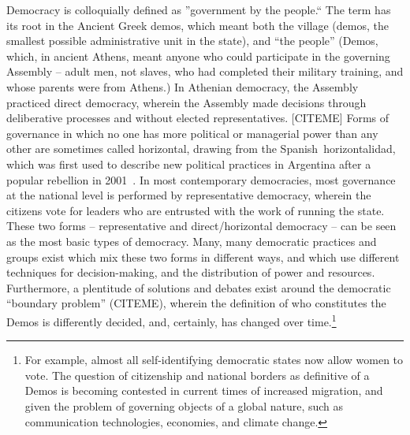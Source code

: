 Democracy is colloquially defined as ''government by the people.`` The term has
its root in the Ancient Greek demos, which meant both the village (demos, the
smallest possible administrative unit in the state), and ``the people'' (Demos,
which, in ancient Athens, meant anyone who could participate in the governing
Assembly -- adult men, not slaves, who had completed their military training,
and whose parents were from Athens.) In Athenian democracy, the Assembly
practiced direct democracy, wherein the Assembly made decisions through
deliberative processes and without elected representatives. [CITEME] Forms of
governance in which no one has more political or managerial power than any other
are sometimes called horizontal, drawing from the Spanish horizontalidad, which
was first used to describe new political practices in Argentina after a popular
rebellion in 2001~\cite{sitrin2012everyday}. In most contemporary democracies,
most governance at the national level is performed by representative democracy,
wherein the citizens vote for leaders who are entrusted with the work of running
the state. These two forms – representative and direct/horizontal democracy --
can be seen as the most basic types of democracy. Many, many democratic
practices and groups exist which mix these two forms in different ways, and
which use different techniques for decision-making, and the distribution of
power and resources. Furthermore, a plentitude of solutions and debates exist
around the democratic ``boundary problem'' (CITEME), wherein the definition of
who constitutes the Demos is differently decided, and, certainly, has changed
over time.\footnote{For example, almost all self-identifying democratic states
now allow women to vote. The question of citizenship and national borders as
definitive of a Demos is becoming contested in current times of increased
migration, and given the problem of governing objects of a global nature, such
as communication technologies, economies, and climate change.}

